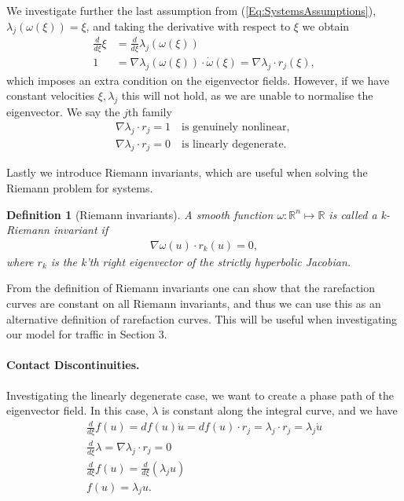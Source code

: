 \documentclass[10pt]{article}
\newtheorem{definition}{Definition}[section]
\numberwithin{equation}{section}
\begin{document}
We investigate further the last assumption from (\ref{Eq:SystemsAssumptions}), $ \lambda_j (\omega(\xi)) = \xi$, and taking the derivative with respect to $\xi$ we obtain
\begin{align*}
    \frac{d}{d\xi} \xi &= \frac{d}{d\xi} \lambda_j( \omega (\xi)) \\
    1 &= \nabla \lambda_j (\omega(\xi)) \cdot \dot \omega (\xi) = \nabla \lambda_j \cdot r_j(\xi),
    \label{Eq:DirectionOfLambda}
\end{align*} 
which imposes an extra condition on the eigenvector fields. However, if we have constant velocities $\xi, \lambda_j$ this will not hold, as we are unable to normalise the eigenvector. We say the $j$th family 
\begin{align*}
    \nabla \lambda_j \cdot r_j = 1 \quad \text{is genuinely nonlinear, } \\
    \nabla \lambda_j \cdot r_j = 0 \quad \text{is linearly degenerate. }
\end{align*}

Lastly we introduce Riemann invariants, which are useful when solving the Riemann problem for systems. \begin{definition}[Riemann invariants]
A smooth function $\omega : \mathbb{R}^n \mapsto \mathbb{R}$ is called a \textit{k-Riemann invariant} if 
\begin{align*}
    \nabla \omega(u) \cdot r_k (u) = 0,
\end{align*}
where $r_k$ is the k'th right eigenvector of the strictly hyperbolic Jacobian.
\end{definition}
From the definition of Riemann invariants one can show that the rarefaction curves are constant on all Riemann invariants, and thus we can use this as an alternative definition of rarefaction curves. This will be useful when investigating our model for traffic in Section $3$.  

\paragraph{Contact Discontinuities.}

Investigating the linearly degenerate case, we want to create a phase path of the eigenvector field. In this case, $\lambda$ is constant along the integral curve, and we have 
\begin{align*}
    \frac{d}{d\xi} f(u) = df(u) \dot u = df(u) \cdot r_j = \lambda_j \cdot r_j = \lambda_j \dot u \\
     \frac{d}{d\xi} \lambda = \nabla \lambda_j \cdot r_j = 0 \\
     \frac{d}{d\xi} f(u) =  \frac{d}{d\xi}( \lambda_j u ) \\
     f(u) = \lambda_j u. 
\end{align*}
\end{document}
